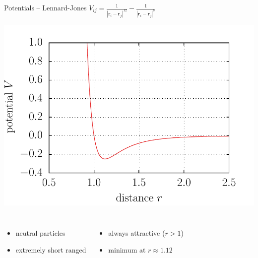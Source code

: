 \documentclass[mathserif,serif]{beamer}
\begin{document}
\begin{frame}{Potentials -- Lennard-Jones}
	\centering
	$V_{ij} = \frac{1}{| \mathbf{r}_i - \mathbf{r}_j |^{12}} - \frac{1}{| \mathbf{r}_i - \mathbf{r}_j |^6}$
	
	
	\includegraphics[height=0.5\textheight]{./figures/potential_lennard_jones.pdf}
	\begin{columns}
			\begin{itemize}
				\item neutral particles
				\item extremely short ranged
			\end{itemize}
			\begin{itemize}
				\item always attractive ($r > 1$)
				\item minimum at $r\approx 1.12$
			\end{itemize}
	\end{columns}
	
\end{frame}

\end{document}
